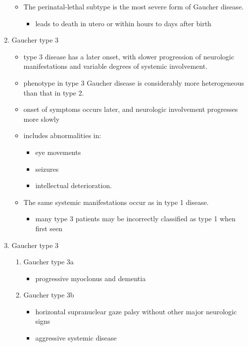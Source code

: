 \documentclass{scrartcl}
\begin{document}
\begin{enumerate}
\begin{itemize}
\item The perinatal-lethal subtype is the most severe form of Gaucher
disease.

\begin{itemize}
\item leads to death in utero or within hours to days after
birth
\end{itemize}
\end{itemize}

\item Gaucher type 3
\label{sec:org7ae4e41}
\begin{itemize}
\item type 3 disease has a later onset, with slower progression of
neurologic manifestations and variable degrees of systemic
involvement.
\item phenotype in type 3 Gaucher disease is considerably more
heterogeneous than that in type 2.

\item onset of symptoms occurs later, and neurologic involvement
progresses more slowly

\item includes abnormalities in:
\begin{itemize}
\item eye movements
\item seizures
\item intellectual deterioration.
\end{itemize}

\item The same systemic manifestations occur as in type 1 disease.
\begin{itemize}
\item many type 3 patients may be incorrectly classified as type 1 when
first seen
\end{itemize}
\end{itemize}

\item Gaucher type 3
\label{sec:orga5003b9}
\begin{enumerate}
\item Gaucher type 3a
\label{sec:orgbe742c5}
\begin{itemize}
\item progressive myoclonus and dementia
\end{itemize}

\item Gaucher type 3b
\label{sec:org2e298c3}
\begin{itemize}
\item horizontal supranuclear gaze palsy without other major
neurologic signs
\item aggressive systemic disease
\end{itemize}


\end{enumerate}
\end{enumerate}
\end{document}
